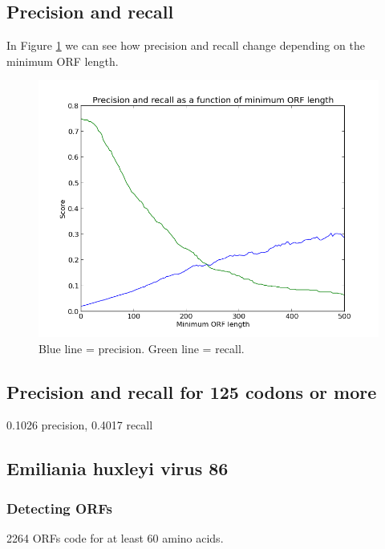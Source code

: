 \documentclass[a4paper,11pt]{article}
\begin{document}
\subsection{Precision and recall}
In Figure \ref{precrec} we can see how precision and recall change depending on the minimum ORF length.
\begin{figure}[h!]
\begin{center}
\includegraphics[scale=0.65]{precision-recall.png}
\caption{Blue line = precision. Green line = recall.}
\label{precrec}
\end{center}
\end{figure}

\subsection{Precision and recall for 125 codons or more}
0.1026 precision, 0.4017 recall

\subsection*{Emiliania huxleyi virus 86}

\subsubsection{Detecting ORFs}
2264 ORFs code for at least 60 amino acids.
\end{document}
